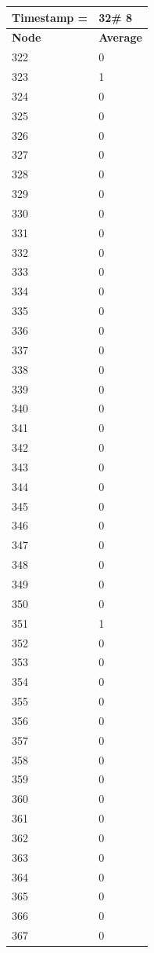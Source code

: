 \begin{tabular}{|l||l|}
\hline
\textbf{Timestamp =} & \textbf{32}\# 8\\\hline
	\textbf{Node} & \textbf{Average} \\ \hline
\hline
	322 & 0 \\ \hline
	323 & 1 \\ \hline
	324 & 0 \\ \hline
	325 & 0 \\ \hline
	326 & 0 \\ \hline
	327 & 0 \\ \hline
	328 & 0 \\ \hline
	329 & 0 \\ \hline
	330 & 0 \\ \hline
	331 & 0 \\ \hline
	332 & 0 \\ \hline
	333 & 0 \\ \hline
	334 & 0 \\ \hline
	335 & 0 \\ \hline
	336 & 0 \\ \hline
	337 & 0 \\ \hline
	338 & 0 \\ \hline
	339 & 0 \\ \hline
	340 & 0 \\ \hline
	341 & 0 \\ \hline
	342 & 0 \\ \hline
	343 & 0 \\ \hline
	344 & 0 \\ \hline
	345 & 0 \\ \hline
	346 & 0 \\ \hline
	347 & 0 \\ \hline
	348 & 0 \\ \hline
	349 & 0 \\ \hline
	350 & 0 \\ \hline
	351 & 1 \\ \hline
	352 & 0 \\ \hline
	353 & 0 \\ \hline
	354 & 0 \\ \hline
	355 & 0 \\ \hline
	356 & 0 \\ \hline
	357 & 0 \\ \hline
	358 & 0 \\ \hline
	359 & 0 \\ \hline
	360 & 0 \\ \hline
	361 & 0 \\ \hline
	362 & 0 \\ \hline
	363 & 0 \\ \hline
	364 & 0 \\ \hline
	365 & 0 \\ \hline
	366 & 0 \\ \hline
	367 & 0 \\ \hline
\end{tabular}
